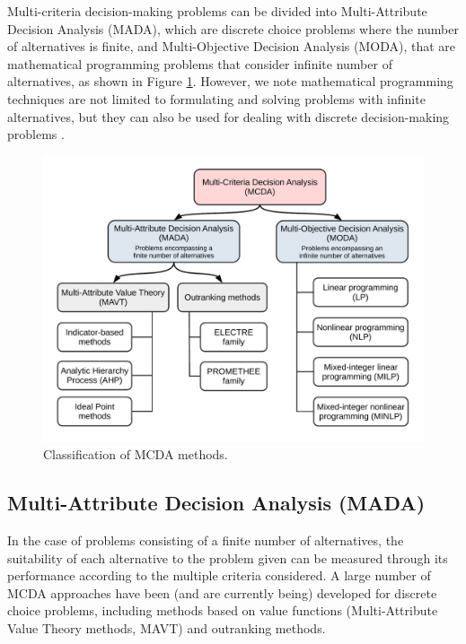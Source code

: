 \begin{refsection}[referencesCh1]
Multi-criteria decision-making problems can be divided into Multi-Attribute Decision Analysis (MADA), which are discrete choice problems where the number of alternatives is finite, and Multi-Objective Decision Analysis (MODA), that are mathematical programming problems that consider infinite number of alternatives, as shown in Figure \ref{fig:Ch1MCDA}. However, we note mathematical programming techniques are not limited to formulating and solving problems with infinite alternatives, but they can also be used for dealing with discrete decision-making problems \citep{giove2009decision}. 

\begin{figure}[h]
	\centering
	\includegraphics[width=1\linewidth, trim={1cm 1cm 1cm 1cm},clip]{gfx/Chapter1/IntroMCDA.pdf} 
	\caption{Classification of MCDA methods.}
	\label{fig:Ch1MCDA}
\end{figure}

\subsection{Multi-Attribute Decision Analysis (MADA)}

In the case of problems consisting of a finite number of alternatives, the suitability of each alternative to the problem given can be measured through its performance according to the multiple criteria considered. A large number of MCDA approaches have been (and are currently being) developed for discrete choice problems, including methods based on value functions (Multi-Attribute Value Theory methods, MAVT) and outranking methods.


\end{refsection}
